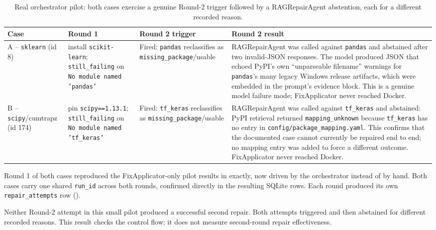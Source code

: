 \begin{table}[htbp]
  \centering
  \small
  \setlength{\tabcolsep}{3pt}
  \begin{tabular}{|p{1.9cm}|p{3.2cm}|p{3.2cm}|p{5.0cm}|}
    \hline
    \textbf{Case} & \textbf{Round 1} & \textbf{Round 2 trigger} & \textbf{Round 2 result} \\
    \hline
    A -- \texttt{sklearn} (id 8) &
      install \texttt{scikit-learn}; \texttt{still\_failing} on \texttt{No module named 'pandas'} &
      Fired: \texttt{pandas} reclassifies as \texttt{missing\_\allowbreak package}/\allowbreak usable &
      RAGRepairAgent was called against \texttt{pandas} and abstained after two invalid-JSON
      responses. The model produced JSON that echoed PyPI's own
      ``unparseable filename'' warnings for \texttt{pandas}'s many legacy Windows release
      artifacts, which were embedded in the prompt's evidence block. This is a genuine model
      failure mode; FixApplicator never reached Docker. \\
    \hline
    B -- \texttt{scipy}/\allowbreak cumtrapz (id 174) &
      pin \texttt{scipy==1.13.1}; \texttt{still\_failing} on \texttt{No module named 'tf\_keras'} &
      Fired: \texttt{tf\_keras} reclassifies as \texttt{missing\_\allowbreak package}/\allowbreak usable &
      RAGRepairAgent was called against \texttt{tf\_keras} and abstained: PyPI retrieval
      returned \texttt{mapping\_unknown} because \texttt{tf\_keras} has no entry in
      \texttt{config/}\allowbreak\texttt{package\_mapping.yaml}. This confirms that the
      documented case cannot currently be repaired end to end; no mapping entry was added to
      force a different outcome. FixApplicator never reached Docker. \\
    \hline
  \end{tabular}
  \caption{Real orchestrator pilot: both cases exercise a genuine Round-2 trigger followed by a
  RAGRepairAgent abstention, each for a different recorded reason.}
  \label{tab:v-i7-cases}
\end{table}

Round 1 of both cases reproduced the FixApplicator-only pilot results in
 exactly, now driven by the orchestrator instead of
by hand. Both cases carry one shared \texttt{run\_id} across both rounds,
confirmed directly in the resulting SQLite rows. Each round produced its
own \texttt{repair\_attempts} row ().

Neither Round-2 attempt in this small pilot produced a successful second
repair. Both attempts triggered and then abstained for different recorded
reasons. This result checks the control flow; it does not measure second-round
repair effectiveness.


